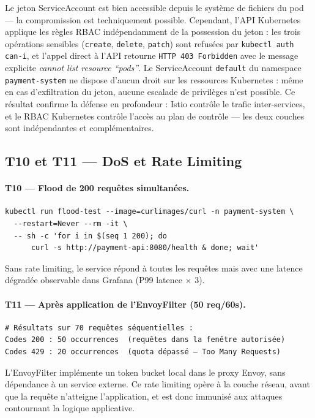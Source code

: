 Le jeton ServiceAccount est bien accessible depuis le système de fichiers du pod
--- la compromission est techniquement possible. Cependant, l'API Kubernetes
applique les règles RBAC indépendamment de la possession du jeton : les trois
opérations sensibles (\texttt{create}, \texttt{delete}, \texttt{patch}) sont
refusées par \texttt{kubectl auth can-i}, et l'appel direct à l'API retourne
\texttt{HTTP 403 Forbidden} avec le message explicite
\textit{cannot list resource ``pods''}.
Le ServiceAccount \texttt{default} du namespace \texttt{payment-system} ne
dispose d'aucun droit sur les ressources Kubernetes : même en cas d'exfiltration
du jeton, aucune escalade de privilèges n'est possible.
Ce résultat confirme la défense en profondeur : Istio contrôle le trafic
inter-services, et le RBAC Kubernetes contrôle l'accès au plan de contrôle ---
les deux couches sont indépendantes et complémentaires.


\subsection{T10 et T11 --- DoS et Rate Limiting}

\paragraph{T10 --- Flood de 200 requêtes simultanées.}
\begin{verbatim}
kubectl run flood-test --image=curlimages/curl -n payment-system \
  --restart=Never --rm -it \
  -- sh -c 'for i in $(seq 1 200); do
      curl -s http://payment-api:8080/health & done; wait'
\end{verbatim}

Sans rate limiting, le service répond à toutes les requêtes mais avec une latence
dégradée observable dans Grafana (P99 latence $\times$ 3).

\paragraph{T11 --- Après application de l'EnvoyFilter (50 req/60s).}
\begin{verbatim}
# Résultats sur 70 requêtes séquentielles :
Codes 200 : 50 occurrences  (requêtes dans la fenêtre autorisée)
Codes 429 : 20 occurrences  (quota dépassé — Too Many Requests)
\end{verbatim}

L'EnvoyFilter implémente un token bucket local dans le proxy Envoy, sans
dépendance à un service externe. Ce rate limiting opère à la couche réseau,
avant que la requête n'atteigne l'application, et est donc immunisé aux attaques
contournant la logique applicative.

